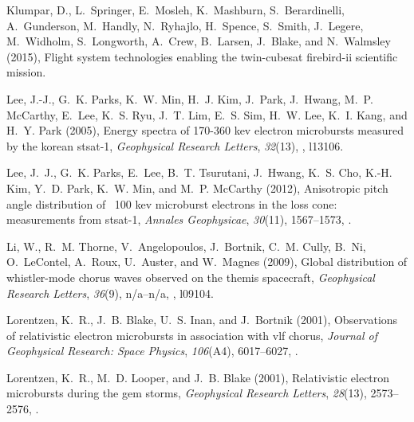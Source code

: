 \documentclass[draft, linenumbers]{agujournal}
\begin{document}
\begin{thebibliography}{49}
Klumpar, D., L.~Springer, E.~Mosleh, K.~Mashburn, S.~Berardinelli,
  A.~Gunderson, M.~Handly, N.~Ryhajlo, H.~Spence, S.~Smith, J.~Legere,
  M.~Widholm, S.~Longworth, A.~Crew, B.~Larsen, J.~Blake, and N.~Walmsley
  (2015), Flight system technologies enabling the twin-cubesat firebird-ii
  scientific mission.

Lee, J.-J., G.~K. Parks, K.~W. Min, H.~J. Kim, J.~Park, J.~Hwang, M.~P.
  McCarthy, E.~Lee, K.~S. Ryu, J.~T. Lim, E.~S. Sim, H.~W. Lee, K.~I. Kang, and
  H.~Y. Park (2005), Energy spectra of 170-360 kev electron microbursts
  measured by the korean stsat-1, \textit{Geophysical Research Letters},
  \textit{32}(13), , l13106.

Lee, J.~J., G.~K. Parks, E.~Lee, B.~T. Tsurutani, J.~Hwang, K.~S. Cho, K.-H.
  Kim, Y.~D. Park, K.~W. Min, and M.~P. McCarthy (2012), Anisotropic pitch
  angle distribution of ~100 kev microburst electrons in the loss cone:
  measurements from stsat-1, \textit{Annales Geophysicae}, \textit{30}(11),
  1567--1573, .

Li, W., R.~M. Thorne, V.~Angelopoulos, J.~Bortnik, C.~M. Cully, B.~Ni,
  O.~LeContel, A.~Roux, U.~Auster, and W.~Magnes (2009), Global distribution of
  whistler-mode chorus waves observed on the themis spacecraft,
  \textit{Geophysical Research Letters}, \textit{36}(9), n/a--n/a,
  , l09104.

Lorentzen, K.~R., J.~B. Blake, U.~S. Inan, and J.~Bortnik (2001{}),
  Observations of relativistic electron microbursts in association with vlf
  chorus, \textit{Journal of Geophysical Research: Space Physics},
  \textit{106}(A4), 6017--6027, .

Lorentzen, K.~R., M.~D. Looper, and J.~B. Blake (2001{}),
  Relativistic electron microbursts during the gem storms, \textit{Geophysical
  Research Letters}, \textit{28}(13), 2573--2576, .


\end{thebibliography}
\end{document}
